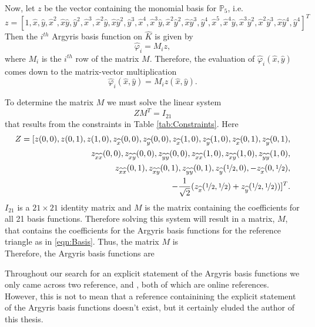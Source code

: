 

Now, let $z$ be the vector containing the monomial basis for $\mathbb{P}_5$, i.e.
\small{
\begin{equation*}
  z=\left[
    1, \hat{x}, \hat{y}, \hat{x}^2, \hat{x}\hat{y}, \hat{y}^2, \hat{x}^3, \hat{x}^2\hat{y}, \hat{x}\hat{y}^2, \hat{y}^3, \hat{x}^4, \hat{x}^3\hat{y},
    \hat{x}^2\hat{y}^2, \hat{x}\hat{y}^3, \hat{y}^4, \hat{x}^5, \hat{x}^4\hat{y}, \hat{x}^3\hat{y}^2, \hat{x}^2\hat{y}^3, \hat{x}\hat{y}^4, \hat{y}^4
  \right]^{T}
\end{equation*}}
Then the $i^{th}$ Argyris basis function on $\hat{K}$ is given by
\begin{equation*}
  \hat{\varphi}_i = M_i z,
\end{equation*}
where $M_i$ is the $i^{th}$ row of the matrix $M$. Therefore, the evaluation of
$\hat{\varphi}_i(\hat{x},\hat{y})$ comes down to the matrix-vector multiplication
\begin{equation*}
  \hat{\varphi}_i(\hat{x},\hat{y}) = M_i z(\hat{x},\hat{y}).
\end{equation*}

To determine the matrix $M$ we must solve the linear system
\begin{equation*}
  ZM^T=I_{21}
\end{equation*}
that results from the constraints in Table \ref{tab:Constraints}. Here
\begin{equation*}
  \begin{split}Z=[z(0,0), z(0,1), z(1,0),
  z_{\hat{x}}(0,0), z_{\hat{y}}(0,0),
  z_{\hat{x}}(1,0), z_{\hat{y}}(1,0),
  z_{\hat{x}}(0,1), z_{\hat{y}}(0,1), \\
  z_{\hat{x}\hat{x}}(0,0), z_{\hat{x}\hat{y}}(0,0), z_{\hat{y}\hat{y}}(0,0),
  z_{\hat{x}\hat{x}}(1,0), z_{\hat{x}\hat{y}}(1,0), z_{\hat{y}\hat{y}}(1,0), \\
  z_{\hat{x}\hat{x}}(0,1), z_{\hat{x}\hat{y}}(0,1), z_{\hat{y}\hat{y}}(0,1),
  z_{\hat{y}}(\nicefrac{1}{2},0), -z_{\hat{x}}(0,\nicefrac{1}{2}), \\
  -\frac{1}{\sqrt{2}}(z_{\hat{x}}(\nicefrac{1}{2},\nicefrac{1}{2}) +
  z_{\hat{y}}(\nicefrac{1}{2},\nicefrac{1}{2}))]^T.\end{split}
\end{equation*}
$I_{21}$ is a $21\times 21$ identity matrix and $M$ is the matrix containing the
coefficients for all 21 basis functions. Therefore solving this system will
result in a matrix, $M$, that contains the coefficients for the Argyris basis
functions for the reference triangle as in \eqref{eqn:Basis}. Thus, the matrix
$M$ is \\

Therefore, the Argyris basis functions are

\begin{remark}
  Throughout our search for an explicit statement of the Argyris basis functions
  we only came across two reference, \cite{Wiki} and \cite{FEM++}, both of which are
  online references. However, this is not to mean that a reference containining
  the explicit statement of the Argyris basis functions doesn't exist, but it
  certainly eluded the author of this thesis.
\end{remark}

